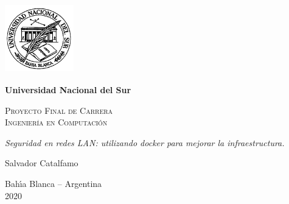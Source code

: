 \begin{titlepage}

\begin{center}
\includegraphics[width=3cm,height=3cm]{uni.bmp}
\end{center}

\begin{center}

\textbf{\LARGE Universidad Nacional del Sur}\\

\vspace{2cm}

\textsc{\LARGE Proyecto Final de Carrera}\\ \vspace{.1cm}
\textsc{\LARGE Ingenier\'ia en Computaci\'on}\\

\vspace{4cm}

\emph{\LARGE Seguridad en redes LAN: utilizando docker para mejorar la infraestructura.}\\

\vspace{2.5cm}

{\Large Salvador Catalfamo}\\

\vspace{2.5cm}

{\sc\Large Bah\'{\i}a Blanca -- Argentina}\\
\vspace*{.1cm} {\Large 2020}

\end{center}
\end{titlepage}
